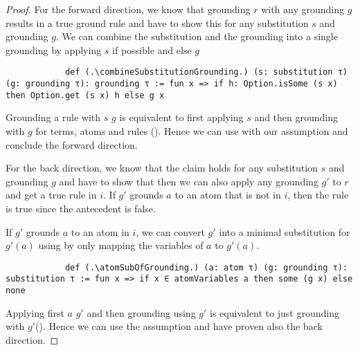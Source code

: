     \begin{proof}
        For the forward direction, we know that grounding $r$ with any grounding $g$ results in a true ground rule and have to show this for any substitution $s$ and grounding $g$. We can combine the substitution and the grounding into a single grounding by applying $s$ if possible and else $g$

        \begin{lstlisting}
            def (.\combineSubstitutionGrounding.) (s: substitution τ) (g: grounding τ): grounding τ := fun x => if h: Option.isSome (s x) then Option.get (s x) h else g x
        \end{lstlisting}

        Grounding a rule with \combineSubstitutionGrounding $s$ $g$ is equivalent to first applying $s$ and then grounding with $g$ for terms, atoms and rules (\combineSubstitutionGroundingEquivRule). Hence we can use \combineSubstitutionGrounding with our assumption and conclude the forward direction.

        For the back direction, we know that the claim holds for any substitution $s$ and grounding $g$ and have to show that then we can also apply any grounding $g'$ to $r$ and get a true rule in $i$. If $g'$ grounds $a$ to an atom that is not in $i$, then the rule is true since the antecedent is false.

        If $g'$ grounds $a$ to an atom in $i$, we can convert $g'$ into a minimal substitution for $g'(a)$ using \atomSubOfGrounding by only mapping the variables of $a$ to $g'(a)$.

        \begin{lstlisting}
            def (.\atomSubOfGrounding.) (a: atom τ) (g: grounding τ): substitution τ := fun x => if x ∈ atomVariables a then some (g x) else none
        \end{lstlisting}

        Applying first \atomSubOfGrounding $a$ $g'$ and then grounding using $g'$ is equivalent to just grounding with $g'$(\atomSubOfGroundingGroundingEqGroundingOnRule). Hence we can use the assumption and have proven also the back direction.
    \end{proof}

